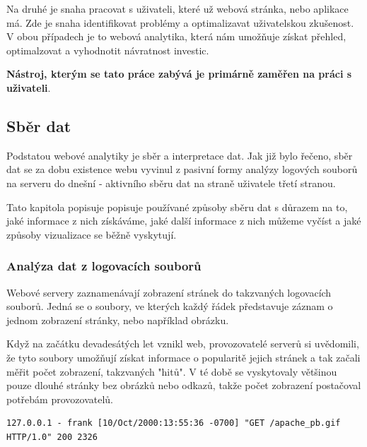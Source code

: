 \documentclass[bc,female,java,dept456]{diploma}						%
\begin{document}
Na druhé je snaha pracovat s uživateli, které už webová stránka, nebo aplikace má. Zde je snaha identifikovat problémy a optimalizavat uživatelskou zkušenost. V obou případech je to webová analytika, která nám umožňuje získat přehled, optimalzovat a vyhodnotit návratnost investic.

{\bf Nástroj, kterým se tato práce zabývá je primárně zaměřen na práci s uživateli}.









\subsection{Sběr dat}

Podstatou webové analytiky je sběr a interpretace dat. Jak již bylo řečeno, sběr dat se za dobu existence webu vyvinul z pasivní formy analýzy logových souborů na serveru do dnešní - aktivního sběru dat na straně uživatele třetí stranou.

Tato kapitola popisuje popisuje používané způsoby sběru dat s důrazem na to, jaké informace z nich získáváme, jaké další informace z nich můžeme vyčíst a jaké způsoby vizualizace se běžně vyskytují.





\subsubsection{Analýza dat z logovacích souborů}

Webové servery zaznamenávají zobrazení stránek do takzvaných logovacích souborů. Jedná se o soubory, ve kterých každý řádek představuje záznam o jednom zobrazení stránky, nebo například obrázku.

Když na začátku devadesátých let vznikl web, provozovatelé serverů si uvědomili, že tyto soubory umožňují získat informace o popularitě jejich stránek a tak začali měřit počet zobrazení, takzvaných "hitů". V té době se vyskytovaly většinou pouze dlouhé stránky bez obrázků nebo odkazů, takže počet zobrazení postačoval potřebám provozovatelů.

\bigskip

\begin{lstlisting}[label=src:Plain,caption=Formát logovacího souboru dle RFC931]
127.0.0.1 - frank [10/Oct/2000:13:55:36 -0700] "GET /apache_pb.gif HTTP/1.0" 200 2326
\end{lstlisting}
\end{document}
